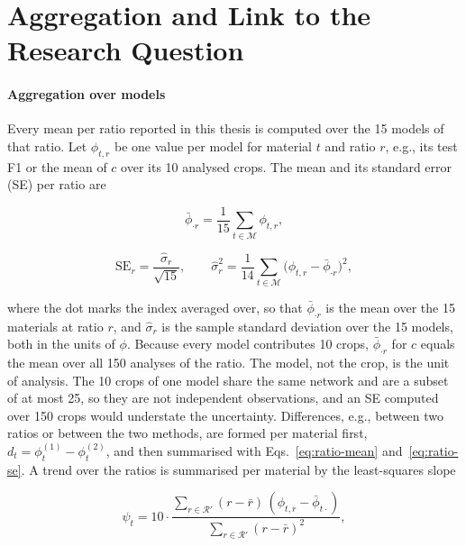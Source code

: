 \section{Aggregation and Link to the Research Question}
\label{sec:methodology-aggregation}

\paragraph{Aggregation over models}
Every mean per ratio reported in this thesis is computed over the 15 models of that
ratio. Let $\phi_{t,r}$ be one value per model for material $t$ and ratio $r$, e.g., its
test F1 or the mean of $c$ over its 10 analysed crops. The mean and its standard error
(SE) per ratio are

\begin{equation}
\bar{\phi}_{\cdot r} = \frac{1}{15} \sum_{t \in \mathcal{M}} \phi_{t,r},
\label{eq:ratio-mean}
\end{equation}

\begin{equation}
\mathrm{SE}_r = \frac{\hat{\sigma}_r}{\sqrt{15}}, \qquad
\hat{\sigma}_r^2 = \frac{1}{14} \sum_{t \in \mathcal{M}}
\big(\phi_{t,r} - \bar{\phi}_{\cdot r}\big)^2,
\label{eq:ratio-se}
\end{equation}

where the dot marks the index averaged over, so that $\bar{\phi}_{\cdot r}$ is the mean
over the 15 materials at ratio $r$, and $\hat{\sigma}_r$ is the sample standard deviation
over the 15 models, both in the units of $\phi$. Because every model contributes 10
crops, $\bar{\phi}_{\cdot r}$ for $c$ equals the mean over all 150 analyses of the
ratio. The model, not the crop, is the unit of analysis. The 10 crops of one model
share the same network and are a subset of at most 25, so they are not independent
observations, and an SE computed over 150 crops would understate the uncertainty.
Differences, e.g., between two ratios or between the two methods, are formed per
material first, $d_t = \phi^{(1)}_{t} - \phi^{(2)}_{t}$, and then summarised with
Eqs.~\eqref{eq:ratio-mean} and~\eqref{eq:ratio-se}. A trend over the ratios is
summarised per material by the least-squares slope

\begin{equation}
\psi_t = 10 \cdot \frac{\sum_{r \in \mathcal{R}'} (r - \bar{r})\,
(\phi_{t,r} - \bar{\phi}_{t \cdot})}{\sum_{r \in \mathcal{R}'} (r - \bar{r})^2},
\label{eq:slope}
\end{equation}

